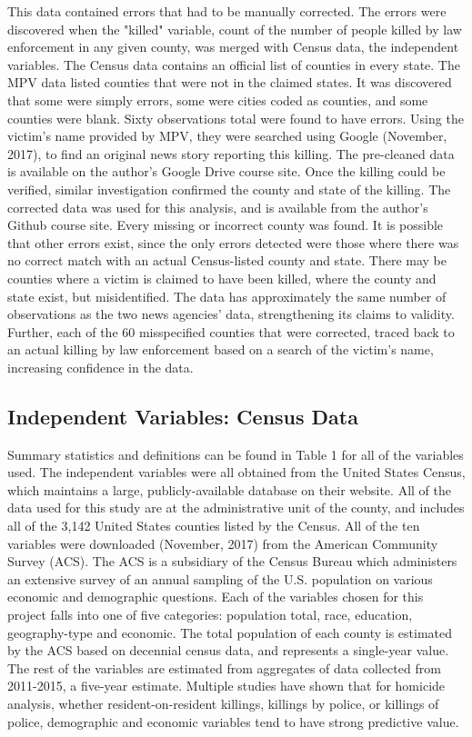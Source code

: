 \documentclass[sigconf]{acmart}
\begin{document}
This data contained errors that had to be manually corrected.  The errors were discovered when the "killed" variable, count of the number of people killed by law enforcement in any given county, was merged with Census data, the independent variables.  The Census data contains an official list of counties in every state. The MPV data listed counties that were not in the claimed states.  It was discovered that some were simply errors, some were cities coded as counties, and some counties were blank.  Sixty observations total were found to have errors.  Using the victim's name provided by MPV, they were searched using Google (November, 2017), to find an original news story reporting this killing. The pre-cleaned data is available on the author's Google Drive course site. \cite{townsleyG}  Once the killing could be verified, similar investigation confirmed the county and state of the killing.  The corrected data was used for this analysis, and is available from the author's Github course site. \cite{townsleyR}  Every missing or incorrect county was found.  It is possible that other errors exist, since the only errors detected were those where there was no correct match with an actual Census-listed county and state.  There may be counties where a victim is claimed to have been killed, where the county and state exist, but misidentified.  The data has approximately the same number of observations as the two news agencies' data, strengthening its claims to validity.  Further, each of the 60 misspecified counties that were corrected, traced back to an actual killing by law enforcement based on a search of the victim's name, increasing confidence in the data.

\subsection{Independent Variables: Census Data}
Summary statistics and definitions can be found in Table 1 for all of the variables used.  The independent variables were all obtained from the United States Census, which maintains a large, publicly-available database on their website. \cite{census}  All of the data used for this study are at the administrative unit of the county, and includes all of the 3,142 United States counties listed by the Census.  All of the ten variables were downloaded (November, 2017) from the American Community Survey (ACS). The ACS is a subsidiary of the Census Bureau which administers an extensive survey of an annual sampling of the U.S. population on various economic and demographic questions.  Each of the variables chosen for this project falls into one of five categories: population total, race, education, geography-type and economic.  The total population of each county is estimated by the ACS based on decennial census data, and represents a single-year value.  The rest of the variables are estimated from aggregates of data collected from 2011-2015, a five-year estimate.  Multiple studies have shown that for homicide analysis, whether resident-on-resident killings, killings by police, or killings of police, demographic and economic variables tend to have strong predictive value. \cite{pridemore05,kaminski05,legewie15,patterson16,smith14}
\end{document}
